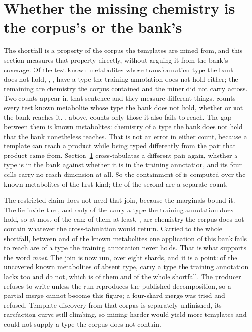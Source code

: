 \documentclass[journal=jcisd8,manuscript=suppinfo,layout=onecolumn]{achemso}
\begin{document}
\section{Whether the missing chemistry is the corpus's or the bank's}
\label{sec:si-typeoverlap}

The shortfall is a property of the corpus the templates are mined from, and this section measures
that property directly, without arguing it from the bank's coverage. Of the
\numTypeoverlapBanklacks{} test
known metabolites whose transformation type the bank does not hold, \numTypeoverlapCorpuslackstoo{},
\numTypeoverlapCorpussharePct{}, have a type the training annotation does not hold either; the
remaining \numTypeoverlapMinerslost{} are chemistry the corpus contained and the miner did not
carry across. Two counts appear in that sentence and they measure different things.
\numTypeoverlapBanklacks{} counts every test known metabolite whose type the bank does not hold, whether
or not the bank reaches it. \numCeilingNovel{}, above, counts only those it also fails to reach.
The gap between them is \numTypeoverlapReached{} known metabolites: chemistry of a type the bank does not
hold that the bank nonetheless reaches. That is not an error in either count, because a template can
reach a product while being typed differently from the pair that product came from.
Section~\ref{sec:si-typeoverlap} cross-tabulates a different pair again, whether a type is in the
bank against whether it is in the training annotation, and its four cells carry no reach dimension
at all. So the containment of \numTypeoverlapCorpussharePct{} is computed over the
\numTypeoverlapBanklacks{} known metabolites of the first kind; the \numCeilingNovel{} of the second are a
separate count.

The restricted claim does not need that join, because the marginals bound it. The
\numCeilingNovel{} lie inside the \numTypeoverlapBanklacks{}, and only
\numTypeoverlapMinerslost{} of the \numTypeoverlapBanklacks{} carry a type the training annotation
does hold, so at most \numTypeoverlapMinerslost{} of the \numCeilingNovel{} can:
\numBoundCorpusabsentmin{} of them at least, \numBoundCorpusabsentsharemin{}, are chemistry the
corpus does not contain whatever the cross-tabulation would return. Carried to the whole shortfall,
between \numBoundShortfallsharemin{} and \numBoundShortfallsharemax{} of the
\numCeilingUncovered{} known metabolites one application of this bank fails to reach are of a type the
training annotation never holds. That is what supports the word \emph{most}. The join is now run,
over eight shards, and it is a point: of the \numCeilingNovel{} uncovered known metabolites of absent type,
\numContainmentAbsent{} carry a type the training annotation lacks too and \numContainmentPresentWord{} do
not, which is \numContainmentSharePct{} of them and \numContainmentShortfallsharePct{} of the whole
shortfall. The producer refuses to write unless the run reproduces the published decomposition,
so a partial merge cannot become this figure; a four-shard merge was tried and refused. Template discovery from that
corpus is separately unfinished, its rarefaction curve still climbing, so mining harder would yield
more templates and could not supply a type the corpus does not contain.
\end{document}
